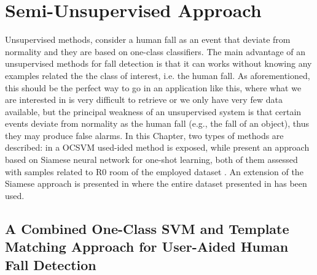 \chapter{Semi-Unsupervised Approach}

Unsupervised methods, consider a human fall as an event that deviate from normality and they are based on one-class classifiers. The main advantage of an unsupervised methods for fall detection is that it can works without knowing any examples related the the class of interest, i.e. the human fall. As aforementioned, this should be the perfect way to go in an application like this, where what we are interested in is very difficult to retrieve or we only have very few data available, but the principal weakness of an unsupervised system is that certain events deviate from normality as the human fall (e.g., the fall of an object), thus they may produce false alarms.
In this Chapter, two types of methods are described: in  a OCSVM used-ided method is exposed, while  present an approach based on Siamese neural network for one-shot learning, both of them assessed with samples related to R0 room of the employed dataset . An extension of the Siamese approach is presented in  where the entire dataset presented in  has been used.




\section{A Combined One-Class SVM and Template Matching Approach for User-Aided Human Fall Detection}
\label{sec:user_aided_cin}

